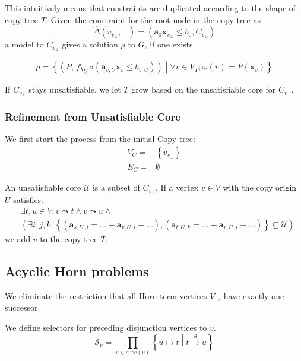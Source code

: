\documentclass[a4paper,12pt]{article}
\newcommand{\edgel}[3]{#1\xrightarrow{#2}#3}
\begin{document}
This intuitively means that constraints are duplicated according to
the shape of copy tree $T$.  Given the constraint for the root node in
the copy tree as
\[ \hat \Delta (v_{v_\bot}, \bot) = (\mathbf{a}_0 \mathbf{x}_{v_\bot} \leq b_0, C_{v_\bot}) \]
a model to $C_{v_\bot}$ gives a solution $\rho$ to $G$, if one exists.

\begin{align*}
 \rho = \left\lbrace
  \left( P, \bigwedge_U \sigma(\mathbf{a}_{v,U} \mathbf{x}_v \leq b_{v,U}) \right) \middle|
  \forall v \in V_T; \varphi(v) = P(\mathbf{x}_v)
 \right\rbrace
\end{align*}

If $C_{v_\bot}$ stays unsatisfiable, we let $T$ grow based on the
unsatisfiable core for $C_{v_\bot}$.

\subsubsection{Refinement from Unsatisfiable Core}

We first start the process from the initial Copy tree:
\begin{align*}
V_C = & \left\lbrace v_{v_\bot} \right\rbrace \\
E_C = & \emptyset
\end{align*}

An unsatisfiable core $\mathcal{U}$ is a subset of $C_{v_\bot}$.
If a vertex $v \in V$ with the copy origin $U$ satisfies:
\begin{align*}
& \exists t, u \in V; v \leadsto t \wedge v \leadsto u \wedge \\
& \left( \exists i, j, k;
\left\lbrace \left( \mathbf{a}_{s,U,j} = \ldots + \mathbf{a}_{v,U,i} + \ldots \right),
\left( \mathbf{a}_{t,U,k} = \ldots + \mathbf{a}_{v,U,i} + \ldots \right)
\right\rbrace \subseteq \mathcal{U} \right)
\end{align*}
we add $v$ to the copy tree $T$.

\subsection{Acyclic Horn problems}

We eliminate the restriction that all Horn term vertices
$V_\Rightarrow$ have exactly one successor.

We define selectors for preceding disjunction vertices to $v$.
\[ \mathcal{S}_v = \prod_{u \in \mathrm{succ}(v)} \left\lbrace u \mapsto t \middle| \edgel{t}{\theta}{u} \right\rbrace \]
\end{document}

